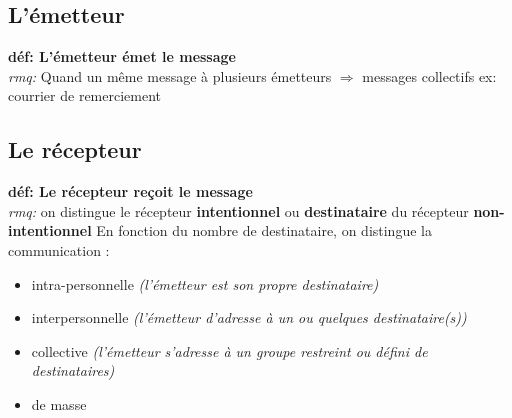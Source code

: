 \documentclass[a4paper,11pt]{report}
\begin{document}
\subsection{L'émetteur}
\textbf{déf: L'émetteur émet le message}\\
\textit{rmq:} Quand un même message à plusieurs émetteurs $\Rightarrow$ messages collectifs
    ex: courrier de remerciement

\subsection{Le récepteur}
\textbf{déf: Le récepteur reçoit le message}\\
\textit{rmq:} on distingue le récepteur \textbf{intentionnel} ou \textbf{destinataire} du récepteur \textbf{non-intentionnel}
En fonction du nombre de destinataire, on distingue la communication :
\begin{itemize}
    \item intra-personnelle \textit{(l'émetteur est son propre destinataire)}
    \item interpersonnelle \textit{(l'émetteur d'adresse à un ou quelques destinataire(s))}
    \item collective \textit{(l'émetteur s'adresse à un groupe restreint ou défini de destinataires)}
    \item de masse 
\end{itemize}
\end{document}
